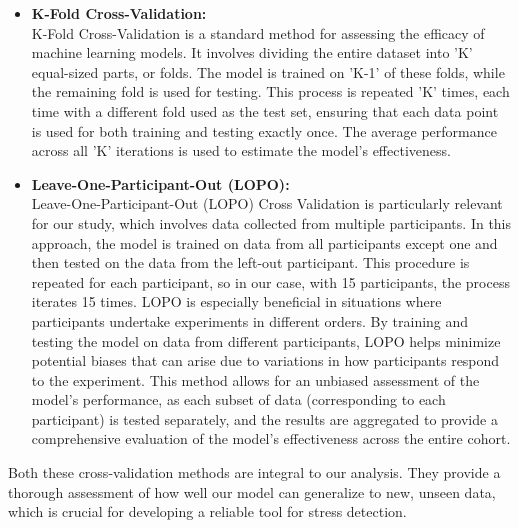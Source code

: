\begin{itemize}
  \item \textbf{K-Fold Cross-Validation:} \\
  K-Fold Cross-Validation is a standard method for assessing the efficacy of machine learning models. It involves dividing the entire dataset into 'K' equal-sized parts, or folds. The model is trained on 'K-1' of these folds, while the remaining fold is used for testing. This process is repeated 'K' times, each time with a different fold used as the test set, ensuring that each data point is used for both training and testing exactly once. The average performance across all 'K' iterations is used to estimate the model’s effectiveness.
  
  \item \textbf{Leave-One-Participant-Out (LOPO):} \\
  Leave-One-Participant-Out (LOPO) Cross Validation is particularly relevant for our study, which involves data collected from multiple participants. In this approach, the model is trained on data from all participants except one and then tested on the data from the left-out participant. This procedure is repeated for each participant, so in our case, with 15 participants, the process iterates 15 times. LOPO is especially beneficial in situations where participants undertake experiments in different orders. By training and testing the model on data from different participants, LOPO helps minimize potential biases that can arise due to variations in how participants respond to the experiment. This method allows for an unbiased assessment of the model's performance, as each subset of data (corresponding to each participant) is tested separately, and the results are aggregated to provide a comprehensive evaluation of the model’s effectiveness across the entire cohort.
\end{itemize}

Both these cross-validation methods are integral to our analysis. They provide a thorough assessment of how well our model can generalize to new, unseen data, which is crucial for developing a reliable tool for stress detection.